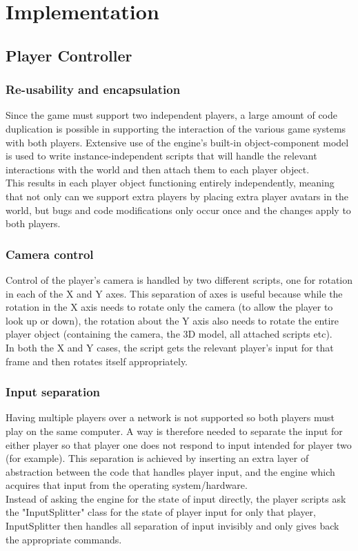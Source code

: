 \documentclass[11pt,a4paper]{article}
\begin{document}
\section{Implementation}
\label{s:implementation}
\subsection{Player Controller}
\subsubsection{Re-usability and encapsulation}
Since the game must support two independent players, a large amount of code duplication is possible in supporting the interaction of the various game systems with both players. Extensive use of the engine's built-in object-component model is used to write instance-independent scripts that will handle the relevant interactions with the world and then attach them to each player object. \\
This results in each player object functioning entirely independently, meaning that not only can we support extra players by placing extra player avatars in the world, but bugs and code modifications only occur once and the changes apply to both players.
\subsubsection{Camera control}
Control of the player's camera is handled by two different scripts, one for rotation in each of the X and Y axes. This separation of axes is useful because while the rotation in the X axis needs to rotate only the camera (to allow the player to look up or down), the rotation about the Y axis also needs to rotate the entire player object (containing the camera, the 3D model, all attached scripts etc). \\
In both the X and Y cases, the script gets the relevant player's input for that frame and then rotates itself appropriately.
\subsubsection{Input separation}
Having multiple players over a network is not supported so both players must play on the same computer. A way is therefore needed to separate the input for either player so that player one does not respond to input intended for player two (for example). This separation is achieved by inserting an extra layer of abstraction between the code that handles player input, and the engine which acquires that input from the operating system/hardware. \\
Instead of asking the engine for the state of input directly, the player scripts ask the "InputSplitter" class for the state of player input for only that player, InputSplitter then handles all separation of input invisibly and only gives back the appropriate commands.
\end{document}
